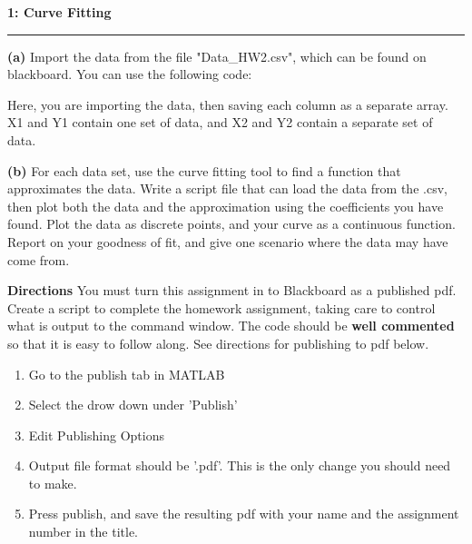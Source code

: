 \documentclass[11pt]{article}
\newcommand\question[2]{\vspace{.25in}\textbf{#1: #2}\vspace{.5em}\hrule\vspace{.10in}}
\renewcommand\part[1]{\vspace{.10in}\textbf{(#1)}}
\begin{document}
\raggedright
\newcommand\NAME{Carl Kingsford}  %
\newcommand\ANDREWID{ckingsf}     %
\newcommand\HWNUM{1}              %


\question{1}{Curve Fitting} 
\part{a} Import the data from the file "Data\_HW2.csv", which can be found on blackboard. You can use the following code:

Here, you are importing the data, then saving each column as a separate array. X1 and Y1 contain one set of data, and X2 and Y2 contain a separate set of data.

\part{b} For each data set, use the curve fitting tool to find a function that approximates the data. Write a script file that can load the data from the .csv, then plot both the data and the approximation using the coefficients you have found. Plot the data as discrete points, and your curve as a continuous function. Report on your goodness of fit, and give one scenario where the data may have come from.

\vspace{1.0em}
\textbf{Directions}
You must turn this assignment in to Blackboard as a published pdf. Create a script to complete the homework assignment, taking care to control what is output to the command window. The code should be \textbf{well commented} so that it is easy to follow along. See directions for publishing to pdf below. 

\begin{enumerate} \itemsep -2pt
\item Go to the publish tab in MATLAB
\item Select the drow down under 'Publish'
\item Edit Publishing Options
\item Output file format should be '.pdf'. This is the only change you should need to make.
\item Press publish, and save the resulting pdf with your name and the assignment number in the title.
\end{enumerate}
\end{document}
